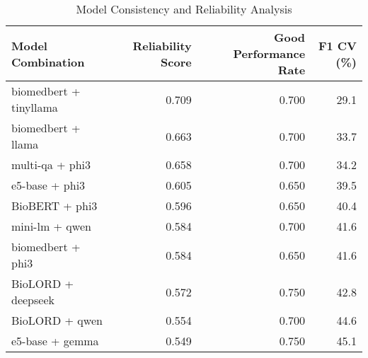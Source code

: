 \begin{table}
\caption{Model Consistency and Reliability Analysis}
\label{tab:consistency_analysis}
\begin{tabular}{lrrr}
\toprule
Model Combination & Reliability Score & Good Performance Rate & F1 CV (\%) \\
\midrule
biomedbert + tinyllama & 0.709 & 0.700 & 29.1 \\
biomedbert + llama & 0.663 & 0.700 & 33.7 \\
multi-qa + phi3 & 0.658 & 0.700 & 34.2 \\
e5-base + phi3 & 0.605 & 0.650 & 39.5 \\
BioBERT + phi3 & 0.596 & 0.650 & 40.4 \\
mini-lm + qwen & 0.584 & 0.700 & 41.6 \\
biomedbert + phi3 & 0.584 & 0.650 & 41.6 \\
BioLORD + deepseek & 0.572 & 0.750 & 42.8 \\
BioLORD + qwen & 0.554 & 0.700 & 44.6 \\
e5-base + gemma & 0.549 & 0.750 & 45.1 \\
\bottomrule
\end{tabular}
\end{table}